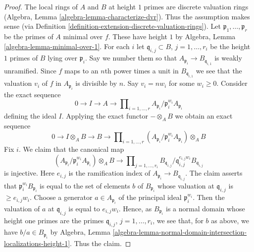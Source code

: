 \documentclass[10pt,a4paper]{amsart}
\theoremstyle{plain}
\theoremstyle{definition}
\theoremstyle{remark}
\numberwithin{equation}{subsection}
\begin{document}
\begin{proof}
The local rings of $A$ and $B$ at height $1$ primes are
discrete valuation rings (Algebra, Lemma \ref{algebra-lemma-characterize-dvr}).
Thus the assumption makes sense (via
Definition \ref{definition-extension-discrete-valuation-rings}).
Let $\mathfrak p_1, \ldots, \mathfrak p_r$ be the primes of $A$ minimal
over $f$. These have height $1$ by
Algebra, Lemma \ref{algebra-lemma-minimal-over-1}.
For each $i$ let $\mathfrak q_{i, j} \subset B$, $j = 1, \ldots, r_i$
be the height $1$ primes of $B$ lying over $\mathfrak p_i$.
Say we number them so that  $A_{\mathfrak p_i} \to B_{\mathfrak q_{i, 1}}$
is weakly unramified.
Since $f$ maps to an $n$th power times a unit in $B_{\mathfrak q_{i, 1}}$
we see that the valuation $v_i$ of $f$ in $A_{\mathfrak p_i}$ is
divisible by $n$. Say $v_i = n w_i$ for some $w_i \geq 0$.
Consider the exact sequence
$$
0 \to I \to A \to
\prod\nolimits_{i = 1, \ldots, r}
A_{\mathfrak p_i}/\mathfrak p_i^{w_i}A_{\mathfrak p_i}
$$
defining the ideal $I$. Applying the exact functor $- \otimes_A B$ we obtain
an exact sequence
$$
0 \to I \otimes_A B \to B \to
\prod\nolimits_{i = 1, \ldots, r}
(A_{\mathfrak p_i}/\mathfrak p_i^{w_i}A_{\mathfrak p_i}) \otimes_A B
$$
Fix $i$. We claim that the canonical map
$$
(A_{\mathfrak p_i}/\mathfrak p_i^{w_i}A_{\mathfrak p_i}) \otimes_A B
\to
\prod\nolimits_{j = 1, \ldots, r_i}
B_{\mathfrak q_{i, j}}/\mathfrak q_{i, j}^{e_{i, j}w_i}B_{\mathfrak q_{i, j}}
$$
is injective. Here $e_{i, j}$ is the ramification index of 
$A_{\mathfrak p_i} \to B_{\mathfrak q_{i, j}}$.
The claim asserts that $\mathfrak p_i^{w_i}B_{\mathfrak p_i}$
is equal to the set of elements $b$ of $B_{\mathfrak p_i}$
whose valuation at $\mathfrak q_{i, j}$ is $\geq e_{i, j}w_i$.
Choose a generator $a \in A_{\mathfrak p_i}$ of the principal
ideal $\mathfrak p_i^{w_i}$. Then the valuation of $a$ at
$\mathfrak q_{i, j}$ is equal to $e_{i, j}w_i$. Hence,
as $B_{\mathfrak p_i}$ is a normal domain whose height one
primes are the primes $\mathfrak q_{i, j}$, $j = 1, \ldots, r_i$,
we see that, for $b$ as above, we have $b/a \in B_{\mathfrak p_i}$ by
Algebra, Lemma
\ref{algebra-lemma-normal-domain-intersection-localizations-height-1}.
Thus the claim.


\end{proof}
\end{document}
